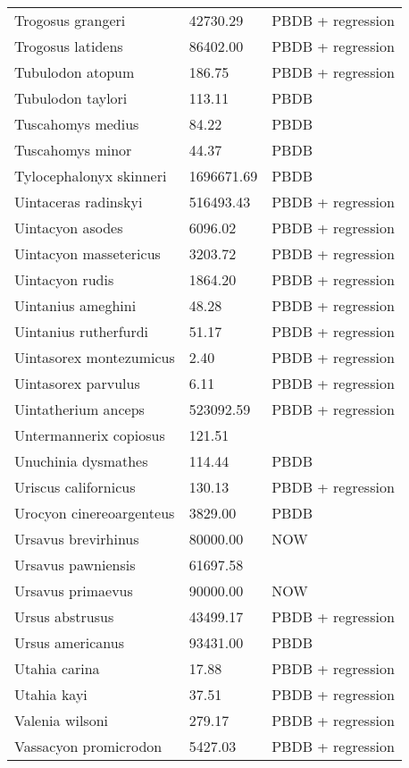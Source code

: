 \documentclass{article}
\begin{document}
\begin{center}
\begin{longtable}{p{} p{} p{}}
    Trogosus grangeri & 42730.29 & PBDB + regression \\ 
    Trogosus latidens & 86402.00 & PBDB + regression \\ 
    Tubulodon atopum & 186.75 & PBDB + regression \\ 
    Tubulodon taylori & 113.11 & PBDB \\ 
    Tuscahomys medius & 84.22 & PBDB \\ 
    Tuscahomys minor & 44.37 & PBDB \\ 
    Tylocephalonyx skinneri & 1696671.69 & PBDB \\ 
    Uintaceras radinskyi & 516493.43 & PBDB + regression \\ 
    Uintacyon asodes & 6096.02 & PBDB + regression \\ 
    Uintacyon massetericus & 3203.72 & PBDB + regression \\ 
    Uintacyon rudis & 1864.20 & PBDB + regression \\ 
    Uintanius ameghini & 48.28 & PBDB + regression \\ 
    Uintanius rutherfurdi & 51.17 & PBDB + regression \\ 
    Uintasorex montezumicus & 2.40 & PBDB + regression \\ 
    Uintasorex parvulus & 6.11 & PBDB + regression \\ 
    Uintatherium anceps & 523092.59 & PBDB + regression \\ 
    Untermannerix copiosus & 121.51 & \cite{Tomiya2013} \\ 
    Unuchinia dysmathes & 114.44 & PBDB \\ 
    Uriscus californicus & 130.13 & PBDB + regression \\ 
    Urocyon cinereoargenteus & 3829.00 & PBDB \\ 
    Ursavus brevirhinus & 80000.00 & NOW \\ 
    Ursavus pawniensis & 61697.58 & \cite{Tomiya2013} \\ 
    Ursavus primaevus & 90000.00 & NOW \\ 
    Ursus abstrusus & 43499.17 & PBDB + regression \\ 
    Ursus americanus & 93431.00 & PBDB \\ 
    Utahia carina & 17.88 & PBDB + regression \\ 
    Utahia kayi & 37.51 & PBDB + regression \\ 
    Valenia wilsoni & 279.17 & PBDB + regression \\ 
    Vassacyon promicrodon & 5427.03 & PBDB + regression \\ 

\end{longtable}
\end{center}
\end{document}
